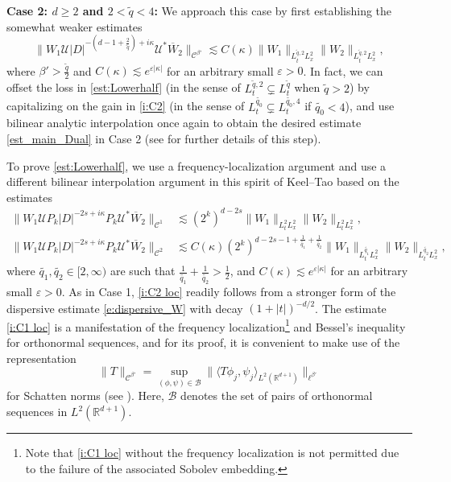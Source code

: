 \documentclass[a4paper]{amsart}
\numberwithin{equation}{section}%
\theoremstyle{plain}%
\theoremstyle{definition}
\theoremstyle{remark}%
\def\C{\mathcal{C}}
\def\C{\mathcal{C}}
\newcommand{\R}{{\mathbb R}}
\begin{document}
\textbf{Case 2: $d \geq 2$ and $2 < \widetilde{q} < 4$:}
We approach this case by first establishing the somewhat weaker estimates
\begin{equation}
    \label{est:Lowerhalf}
    \|W_1\mathcal{U}|D|^{-(d-1+\frac{2}{\widetilde{q}})+i\kappa}\mathcal{U}^*\overline{W}_2\|_{\C^{\beta'}}
\lesssim 
C(\kappa) 
\|W_1\|_{L_t^{\widetilde{q},2}L_x^2}\|W_2\|_{L_t^{\widetilde{q},2}L_x^2},
\end{equation}
where $\beta'>\frac{\widetilde{q}}{2}$ and $C(\kappa) \lesssim e^{\varepsilon |\kappa|}$ for an arbitrary small $\varepsilon >0$. In fact, we can offset the loss in \eqref{est:Lowerhalf} (in the sense of $L_t^{\widetilde{q},2} \subsetneq L_t^{\widetilde{q}}$ when $\widetilde{q} > 2$) by capitalizing on the gain in \eqref{i:C2} (in the sense of $L_t^{\widetilde{q_0}} \subsetneq L_t^{\widetilde{q_0},4}$ if $\widetilde{q_0}< 4$), and use bilinear analytic interpolation once again to obtain the desired estimate \eqref{est_main_Dual} in Case 2 (see \cite{BKS} for further details of this step).

To prove \eqref{est:Lowerhalf}, we use a frequency-localization argument and use a different bilinear interpolation argument in this spirit of Keel--Tao \cite{KeelTao} based on the estimates
\begin{align}\label{i:C1 loc}
    \|W_1\mathcal{U}P_k|D|^{-2s+i\kappa}P_k\mathcal{U}^*\overline{W}_2\|_{\C^1}
    &\lesssim
    (2^k)^{d-2s}
    \|W_1\|_{L_t^{2}L_x^2}\|W_2\|_{L_t^{2}L_x^2},\\
    \label{i:C2 loc}
    \|W_1\mathcal{U}P_k|D|^{-2s+i\kappa}P_k\mathcal{U}^*\overline{W}_2\|_{\C^2}
    &\lesssim
    C(\kappa)
    (2^k)^{d-2s-1+\frac{1}{\widetilde{q_1}}+\frac{1}{\widetilde{q_2}}}
    \|W_1\|_{L_t^{\widetilde{q_1}}L_x^2}\|W_2\|_{L_t^{\widetilde{q_2}}L_x^2},
\end{align}
where $\widetilde{q_1},\widetilde{q_2}\in[2,\infty)$ are such that $\frac{1}{\widetilde{q_1}}+\frac{1}{\widetilde{q_2}}>\frac12$, and $C(\kappa) \lesssim e^{\varepsilon |\kappa|}$ for an arbitrary small $\varepsilon >0$. 
As in Case 1, \eqref{i:C2 loc} readily follows from a stronger form of the dispersive estimate \eqref{e:dispersive_W} with decay $(1 + |t|)^{-d/2}$. 
The estimate \eqref{i:C1 loc} is a manifestation of the frequency localization\footnote{Note that \eqref{i:C1 loc} without the frequency localization is not permitted due to the failure of the associated Sobolev embedding.} and Bessel's inequality for orthonormal sequences, and for its proof, it is convenient to make use of the representation
\[
\| T\|_{\mathcal{C}^{\beta'}} = \sup_{(\phi, \psi) \in \mathcal{B}} \|\langle  T \phi_j,   \psi_j \rangle_{L^2(\R^{d+1})} \|_{\ell^{\beta'}}
\]
for Schatten norms (see \cite[Proposition~2.6]{Simon}). Here, $\mathcal{B}$ denotes the set of pairs of orthonormal sequences in $L^2(\R^{d+1})$. 
\end{document}
